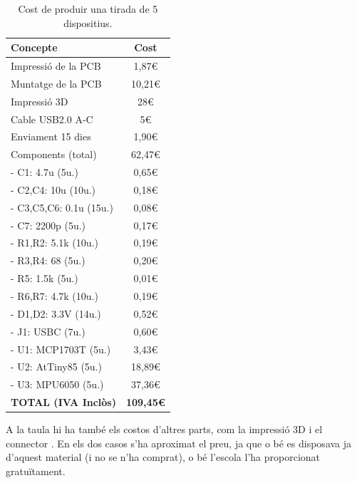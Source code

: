 \begin{table}[ht]
    \centering
    \begin{tabular}{lc}
        \textbf{Concepte}           & \textbf{Cost} \\ \hline
        Impressió de la PCB         & 1,87€         \\
        Muntatge de la PCB          & 10,21€        \\
        Impressió 3D                & 28€           \\
        Cable USB2.0 A-C            & 5€            \\
        Enviament 15 dies           & 1,90€         \\
        Components (total)          & 62,47€        \\
        - C1: 4.7u (5u.)            & 0,65€         \\
        - C2,C4: 10u (10u.)         & 0,18€         \\
        - C3,C5,C6: 0.1u (15u.)     & 0,08€         \\
        - C7: 2200p (5u.)           & 0,17€         \\
        - R1,R2: 5.1k (10u.)        & 0,19€         \\
        - R3,R4: 68 (5u.)           & 0,20€         \\
        - R5: 1.5k (5u.)            & 0,01€         \\
        - R6,R7: 4.7k (10u.)        & 0,19€         \\
        - D1,D2: 3.3V (14u.)        & 0,52€         \\
        - J1: USBC (7u.)            & 0,60€         \\
        - U1: MCP1703T (5u.)        & 3,43€         \\
        - U2: AtTiny85 (5u.)        & 18,89€        \\
        - U3: MPU6050 (5u.)         & 37,36€        \\ \hline
        \textbf{TOTAL (IVA Inclòs)} & \textbf{109,45€}     
        \end{tabular}
    \caption{Cost de produir una tirada de 5 dispositius.}
    \label{tab:jlcpcb}
\end{table}

A la taula hi ha també els costos d'altres parts, com la impressió
3D i el connector . En els dos casos s'ha aproximat el preu, ja que
o bé es disposava ja d'aquest material (i no se n'ha comprat), o bé l'escola
l'ha proporcionat gratuïtament.

